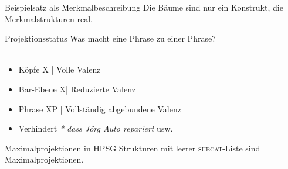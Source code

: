 \begin{frame}
  {Beispielsatz als Merkmalbeschreibung}
  \onslide<+->
  \onslide<+->
  Die Bäume sind nur ein Konstrukt, die Merkmalstrukturen real.\\
  \onslide<+->
  \Halbzeile
  \centering 
\end{frame}

\begin{frame}
  {Projektionsstatus}
  \onslide<+->
  \onslide<+->
  Was macht eine \alert{Phrase zu einer Phrase}?\\
  \\
  \Zeile
  \begin{itemize}[<+->]
    \item Köpfe X | \alert{Volle Valenz}
    \item Bar-Ebene X\Prm | \alert{Reduzierte Valenz}
    \item Phrase XP | \alert{Vollständig abgebundene Valenz}
      \Halbzeile
    \item Verhindert \textit{* dass Jörg Auto repariert} usw.
  \end{itemize}
  \onslide<+->
  \Zeile
  \begin{block}
    {Maximalprojektionen in HPSG}
    Strukturen mit leerer \textsc{subcat}-Liste sind Maximalprojektionen.
  \end{block}
\end{frame}

